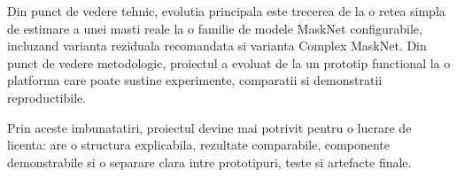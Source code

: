\documentclass[12pt,a4paper]{article}
\begin{document}
Din punct de vedere tehnic, evolutia principala este trecerea de la o retea simpla
de estimare a unei masti reale la o familie de modele MaskNet configurabile,
incluzand varianta reziduala recomandata si varianta Complex MaskNet. Din punct de
vedere metodologic, proiectul a evoluat de la un prototip functional la o platforma
care poate sustine experimente, comparatii si demonstratii reproductibile.

Prin aceste imbunatatiri, proiectul devine mai potrivit pentru o lucrare de
licenta: are o structura explicabila, rezultate comparabile, componente
demonstrabile si o separare clara intre prototipuri, teste si artefacte finale.
\end{document}
